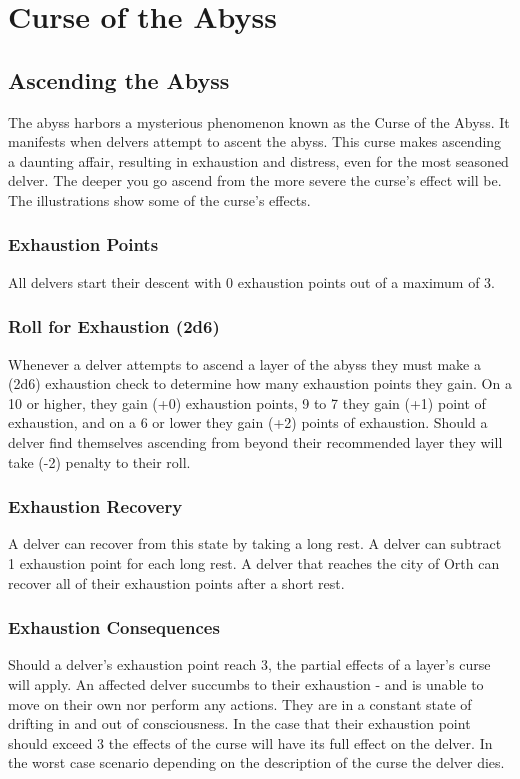 \chapter{Curse of the Abyss}

\section{Ascending the Abyss}
The abyss harbors a mysterious phenomenon known as the Curse of the Abyss. It manifests when delvers attempt to ascent the abyss. This curse makes ascending a daunting affair, resulting in exhaustion and distress, even for the most seasoned delver. The deeper you go ascend from the more severe the curse's effect will be. The illustrations show some of the curse's effects.

\subsection{Exhaustion Points}
{All delvers start their descent with 0 exhaustion points out of a maximum of 3.}

\subsection{Roll for Exhaustion (2d6)}
{Whenever a delver attempts to ascend a layer of the abyss they must make a (2d6) exhaustion check to determine how many exhaustion points they gain. On a 10 or higher, they gain (+0) exhaustion points, 9 to 7 they gain (+1) point of exhaustion, and on a 6 or lower they gain (+2) points of exhaustion. \newline Should a delver find themselves ascending from beyond their recommended layer they will take (-2) penalty to their roll.}

\subsection{Exhaustion Recovery}
{A delver can recover from this state by taking a long rest. A delver can subtract 1 exhaustion point for each long rest. A delver that reaches the city of Orth can recover all of their exhaustion points after a short rest.}

\subsection{Exhaustion Consequences}
{Should a delver's exhaustion point reach 3, the partial effects of a layer's curse will apply. An affected delver succumbs to their exhaustion - and is unable to move on their own nor perform any actions. They are in a constant state of drifting in and out of consciousness. \newline In the case that their exhaustion point should exceed 3 the effects of the curse will have its full effect on the delver. In the worst case scenario depending on the description of the curse the delver dies.}

